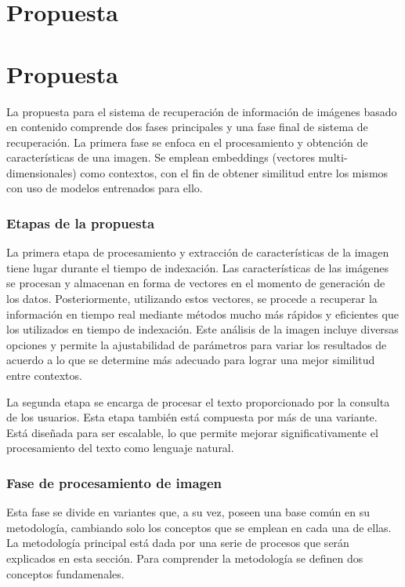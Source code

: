 \chapter{Propuesta}\label{chapter:proposal}
\chapter{Propuesta}\label{chapter:proposal}
La propuesta para el sistema de recuperación de información de imágenes basado en contenido comprende dos fases principales y una fase final de sistema de recuperaci\'on. La primera fase se enfoca en el procesamiento y obtención de características de una imagen. Se emplean embeddings (vectores multi-dimensionales) como contextos, con el fin de obtener similitud entre los mismos con uso de modelos entrenados para ello.

\subsection*{Etapas de la propuesta}

La primera etapa de procesamiento y extracción de características de la imagen tiene lugar durante el tiempo de indexación. Las características de las imágenes se procesan y almacenan en forma de vectores en el momento de generación de los datos. Posteriormente, utilizando estos vectores, se procede a recuperar la información en tiempo real mediante métodos mucho más rápidos y eficientes que los utilizados en tiempo de indexación. Este análisis de la imagen incluye diversas opciones y permite la ajustabilidad de parámetros para variar los resultados de acuerdo a lo que se determine más adecuado para lograr una mejor similitud entre contextos.

La segunda etapa se encarga de procesar el texto proporcionado por la consulta de los usuarios. Esta etapa también está compuesta por más de una variante. Está diseñada para ser escalable, lo que permite mejorar significativamente el procesamiento del texto como lenguaje natural.

\subsection*{Fase de procesamiento de imagen}
Esta fase se divide en variantes que, a su vez, poseen una base común en su metodología, cambiando solo los conceptos que se emplean en cada una de ellas. La metodología principal está dada por una serie de procesos que serán explicados en esta sección. Para comprender la metodología se definen dos conceptos fundamenales.


